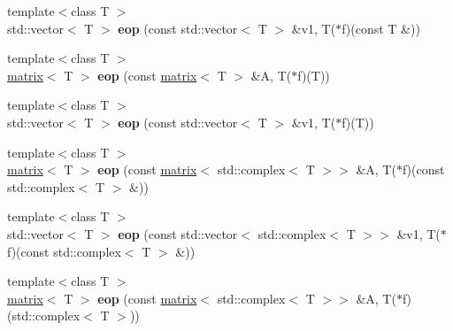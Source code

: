 \begin{DoxyCompactItemize}
\item 
\hypertarget{namespacekeycpp_a1122e5d4ae4b58fc150352b5d38d2cdb}{{\footnotesize template$<$class T $>$ }\\std\-::vector$<$ T $>$ {\bfseries eop} (const std\-::vector$<$ T $>$ \&v1, T($\ast$f)(const T \&))}\label{namespacekeycpp_a1122e5d4ae4b58fc150352b5d38d2cdb}

\item 
\hypertarget{namespacekeycpp_a3a1ba458353cfecef659b40e446baaf0}{{\footnotesize template$<$class T $>$ }\\\hyperlink{classkeycpp_1_1matrix}{matrix}$<$ T $>$ {\bfseries eop} (const \hyperlink{classkeycpp_1_1matrix}{matrix}$<$ T $>$ \&A, T($\ast$f)(T))}\label{namespacekeycpp_a3a1ba458353cfecef659b40e446baaf0}

\item 
\hypertarget{namespacekeycpp_ad7d9f15708903bc3f2c6d26693b8872d}{{\footnotesize template$<$class T $>$ }\\std\-::vector$<$ T $>$ {\bfseries eop} (const std\-::vector$<$ T $>$ \&v1, T($\ast$f)(T))}\label{namespacekeycpp_ad7d9f15708903bc3f2c6d26693b8872d}

\item 
\hypertarget{namespacekeycpp_a5afc215befa38bf47fb52cff33794ebe}{{\footnotesize template$<$class T $>$ }\\\hyperlink{classkeycpp_1_1matrix}{matrix}$<$ T $>$ {\bfseries eop} (const \hyperlink{classkeycpp_1_1matrix}{matrix}$<$ std\-::complex$<$ T $>$$>$ \&A, T($\ast$f)(const std\-::complex$<$ T $>$ \&))}\label{namespacekeycpp_a5afc215befa38bf47fb52cff33794ebe}

\item 
\hypertarget{namespacekeycpp_ad33e9ccd4e31c7c63d31af13d44312e8}{{\footnotesize template$<$class T $>$ }\\std\-::vector$<$ T $>$ {\bfseries eop} (const std\-::vector$<$ std\-::complex$<$ T $>$$>$ \&v1, T($\ast$f)(const std\-::complex$<$ T $>$ \&))}\label{namespacekeycpp_ad33e9ccd4e31c7c63d31af13d44312e8}

\item 
\hypertarget{namespacekeycpp_ae14b016d01024e738c3110299ee58666}{{\footnotesize template$<$class T $>$ }\\\hyperlink{classkeycpp_1_1matrix}{matrix}$<$ T $>$ {\bfseries eop} (const \hyperlink{classkeycpp_1_1matrix}{matrix}$<$ std\-::complex$<$ T $>$$>$ \&A, T($\ast$f)(std\-::complex$<$ T $>$))}\label{namespacekeycpp_ae14b016d01024e738c3110299ee58666}


\end{DoxyCompactItemize}
